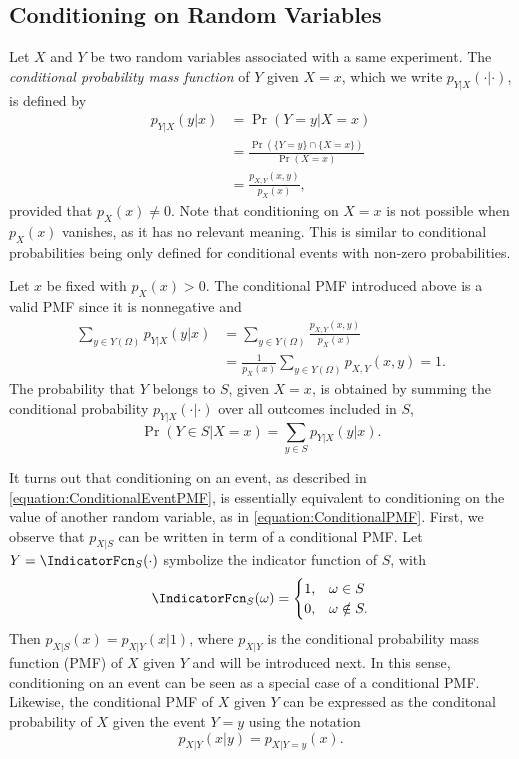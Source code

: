 \subsection{Conditioning on Random Variables}

Let $X$ and $Y$ be two random variables associated with a same experiment.
The \emph{conditional probability mass function} of $Y$ given $X = x$, which we write $p_{Y|X} (\cdot | \cdot)$, is defined by 
\begin{equation} \label{equation:ConditionalPMF}
\begin{split}
p_{Y|X} (y|x) &= \Pr ( Y = y | X = x) \\
&= \frac{\Pr (\{Y = y\} \cap \{ X = x \})}{\Pr (X = x)} \\
&= \frac{ p_{X,Y} (x,y) }{p_X(x)},
\end{split}
\end{equation}
provided that $p_X (x) \neq 0$.
Note that conditioning on $X = x$ is not possible when $p_X (x)$ vanishes, as it has no relevant meaning.
This is similar to conditional probabilities being only defined for conditional events with non-zero probabilities.

Let $x$ be fixed with $p_X (x) > 0$.
The conditional PMF introduced above is a valid PMF since it is nonnegative and
\begin{equation*}
\begin{split}
\sum_{y \in Y(\Omega)} p_{Y|X} (y|x)
&= \sum_{y \in Y(\Omega)} \frac{p_{X,Y} (x,y)}{p_X (x)} \\
&= \frac{1}{p_X (x)} \sum_{y \in Y(\Omega)} p_{X,Y} (x,y) = 1.
\end{split}
\end{equation*}
The probability that $Y$ belongs to $S$, given $X = x$, is obtained by summing the conditional probability $p_{Y|X} (\cdot | \cdot)$ over all outcomes included in $S$,
\begin{equation*}
\Pr (Y \in S | X = x) = \sum_{y \in S} p_{Y|X} (y | x) .
\end{equation*}

It turns out that conditioning on an event, as described in \eqref{equation:ConditionalEventPMF}, is essentially equivalent to conditioning on the value of another random variable, as in \eqref{equation:ConditionalPMF}.
First, we observe that $p_{X|S}$ can be written in term of a conditional PMF.
Let $Y = \IndicatorFcn_S (\cdot)$ symbolize the indicator function of $S$, with
\begin{equation*}
\IndicatorFcn_S (\omega) = \begin{cases} 1, & \omega \in S\\
0, & \omega \notin S . \end{cases}
\end{equation*}
Then $p_{X|S} (x) = p_{X|Y} (x | 1)$, where $p_{X|Y}$ is the conditional probability mass function (PMF) of $X$ given $Y$ and will be introduced next.
In this sense, conditioning on an event can be seen as a special case of a conditional PMF.
Likewise, the conditional PMF of $X$ given $Y$ can be expressed as the conditonal probability of $X$ given the event $Y=y$ using the notation
\[ p_{X|Y} (x|y) = p_{X|Y=y} (x). \]


